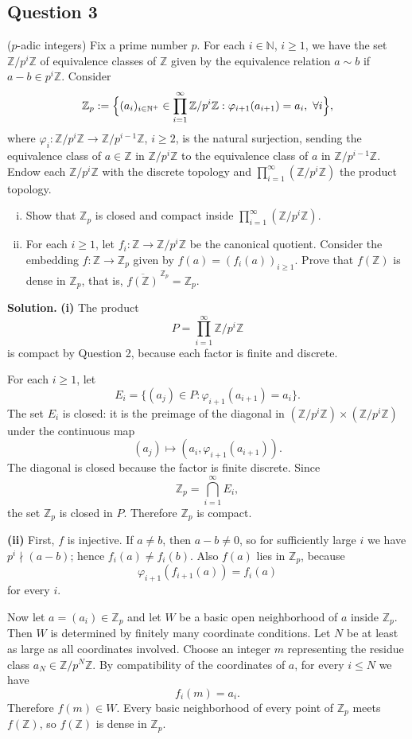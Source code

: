 \documentclass{article}
\newcommand{\Z}{\mathbb{Z}}
\newcommand{\N}{\mathbb{N}}
\newenvironment{solution}{\par\noindent\textbf{Solution.}\quad}{\par}
\begin{document}
\subsection{Question 3}
($p$-adic integers) Fix a prime number $p$. For each $i \in \N$, $i \ge 1$, we have the set $\Z/p^i\Z$ of equivalence classes of $\Z$ given by the equivalence relation $a \sim b$ if $a - b \in p^i\Z$. Consider
\[
  \Z_p := \Bigl\{(a_i)_{i \in \N^+} \in \prod_{i=1}^{\infty} \Z/p^i\Z : \varphi_{i+1}(a_{i+1}) = a_i,\ \forall i \Bigr\},
\]
where $\varphi_i : \Z/p^i\Z \to \Z/p^{i-1}\Z$, $i \ge 2$, is the natural surjection, sending the equivalence class of $a \in \Z$ in $\Z/p^i\Z$ to the equivalence class of $a$ in $\Z/p^{i-1}\Z$. Endow each $\Z/p^i\Z$ with the discrete topology and $\prod_{i=1}^{\infty}(\Z/p^i\Z)$ the product topology.
\begin{enumerate}[(i)]
  \item Show that $\Z_p$ is closed and compact inside $\prod_{i=1}^{\infty}(\Z/p^i\Z)$.
  \item For each $i \ge 1$, let $f_i : \Z \to \Z/p^i\Z$ be the canonical quotient. Consider the embedding $f : \Z \to \Z_p$ given by $f(a) = (f_i(a))_{i \ge 1}$. Prove that $f(\Z)$ is dense in $\Z_p$, that is, $\overline{f(\Z)}^{\,\Z_p} = \Z_p$.
\end{enumerate}

\begin{solution}
\textbf{(i)} The product
\[
  P=\prod_{i=1}^{\infty}\Z/p^i\Z
\]
is compact by Question 2, because each factor is finite and discrete.

For each $i\ge1$, let
\[
  E_i=\{(a_j)\in P:\varphi_{i+1}(a_{i+1})=a_i\}.
\]
The set $E_i$ is closed: it is the preimage of the diagonal in
$(\Z/p^i\Z)\times(\Z/p^i\Z)$ under the continuous map
\[
  (a_j)\mapsto (a_i,\varphi_{i+1}(a_{i+1})).
\]
The diagonal is closed because the factor is finite discrete. Since
\[
  \Z_p=\bigcap_{i=1}^{\infty}E_i,
\]
the set $\Z_p$ is closed in $P$. Therefore $\Z_p$ is compact.

\textbf{(ii)} First, $f$ is injective. If $a\ne b$, then
$a-b\ne0$, so for sufficiently large $i$ we have $p^i\nmid(a-b)$; hence
$f_i(a)\ne f_i(b)$. Also $f(a)$ lies in $\Z_p$, because
\[
  \varphi_{i+1}(f_{i+1}(a))=f_i(a)
\]
for every $i$.

Now let $a=(a_i)\in\Z_p$ and let $W$ be a basic open neighborhood of $a$
inside $\Z_p$. Then $W$ is determined by finitely many coordinate
conditions. Let $N$ be at least as large as all coordinates involved.
Choose an integer $m$ representing the residue class $a_N\in\Z/p^N\Z$.
By compatibility of the coordinates of $a$, for every $i\le N$ we have
\[
  f_i(m)=a_i.
\]
Therefore $f(m)\in W$. Every basic neighborhood of every point of $\Z_p$
meets $f(\Z)$, so $f(\Z)$ is dense in $\Z_p$.
\end{solution}
\end{document}
